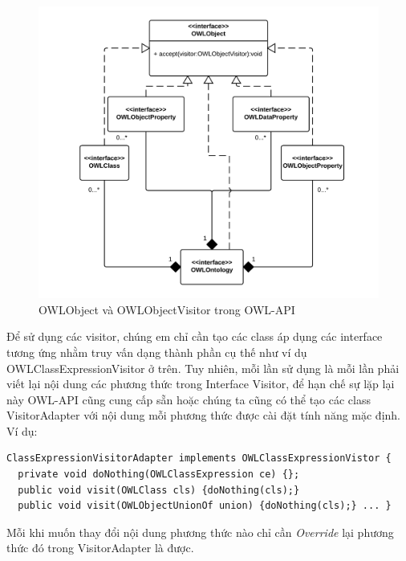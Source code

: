{\begin{figure}[h!]
	\centering
	\includegraphics[width=145mm]{Figures/uml_classdiagram_owlobject_forvisitor_nobackground.png}
	\caption{OWLObject và OWLObjectVisitor trong OWL-API \label{overflow}}
\end{figure}
Để sử dụng các visitor, chúng em chỉ cần tạo các class áp dụng các interface tương ứng nhằm truy vấn dạng thành phần cụ thế như ví dụ OWLClassExpressionVisitor ở trên. Tuy nhiên, mỗi lần sử dụng là mỗi lần phải viết lại nội dung các phương thức trong Interface Visitor, để hạn chế sự lặp lại này OWL-API cũng cung cấp sẵn hoặc chúng ta cũng có thể tạo các class VisitorAdapter với nội dung mỗi phương thức được cài đặt tính năng mặc định. Ví dụ:
\begin{verbatim}
ClassExpressionVisitorAdapter implements OWLClassExpressionVistor {
  private void doNothing(OWLClassExpression ce) {};
  public void visit(OWLClass cls) {doNothing(cls);}
  public void visit(OWLObjectUnionOf union) {doNothing(cls);} ... }
\end{verbatim}
Mỗi khi muốn thay đổi nội dung phương thức nào chỉ cần \textit{Override} lại phương thức đó trong VisitorAdapter là được.
}
